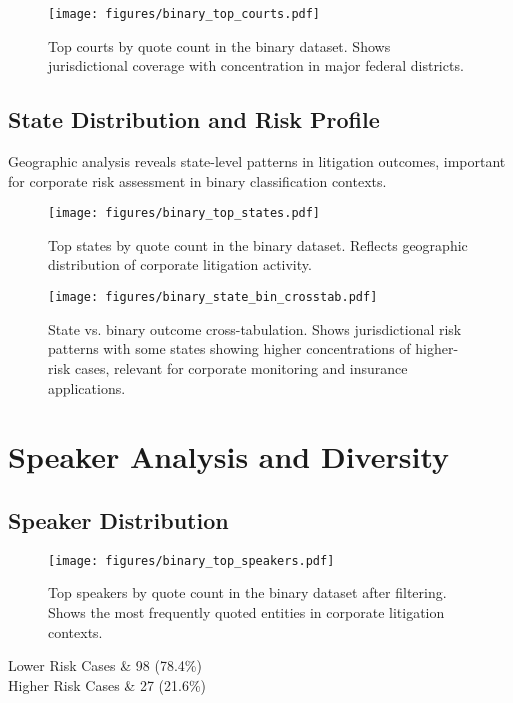 \documentclass[11pt,a4paper]{article}
\begin{document}
\begin{figure}[H]
\centering
\texttt{[image: figures/binary\_top\_courts.pdf]}
\caption{Top courts by quote count in the binary dataset. Shows jurisdictional coverage with concentration in major federal districts.}
\end{figure}

\subsection{State Distribution and Risk Profile}

Geographic analysis reveals state-level patterns in litigation outcomes, important for corporate risk assessment in binary classification contexts.

\begin{figure}[H]
\centering
\texttt{[image: figures/binary\_top\_states.pdf]}
\caption{Top states by quote count in the binary dataset. Reflects geographic distribution of corporate litigation activity.}
\end{figure}

\begin{figure}[H]
\centering
\texttt{[image: figures/binary\_state\_bin\_crosstab.pdf]}
\caption{State vs. binary outcome cross-tabulation. Shows jurisdictional risk patterns with some states showing higher concentrations of higher-risk cases, relevant for corporate monitoring and insurance applications.}
\end{figure}

\section{Speaker Analysis and Diversity}

\subsection{Speaker Distribution}

\begin{figure}[H]
\centering
\texttt{[image: figures/binary\_top\_speakers.pdf]}
\caption{Top speakers by quote count in the binary dataset after filtering. Shows the most frequently quoted entities in corporate litigation contexts.}
\end{figure}


Lower Risk Cases & 98 (78.4\%) \\
Higher Risk Cases & 27 (21.6\%) \\
\end{document}
